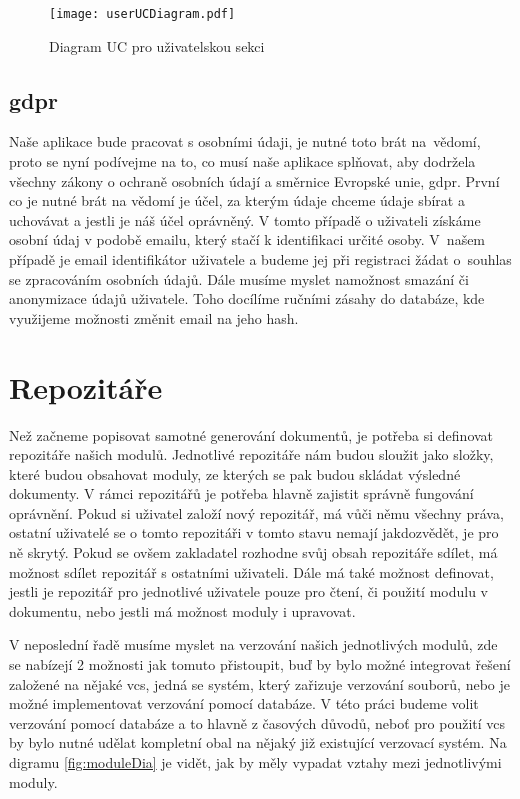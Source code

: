 \begin{figure}[h]
    \centering
    \texttt{[image: userUCDiagram.pdf]}
    \caption{Diagram UC pro uživatelskou sekci}
    \label{fig:userUCDiagram}
\end{figure}

\subsection{\gls{gdpr}}

Naše aplikace bude pracovat s osobními údaji, je nutné toto brát na~vědomí, proto se nyní podívejme na to, co musí naše aplikace splňovat, aby dodržela všechny
zákony o ochraně osobních údají a směrnice Evropské unie, \gls{gdpr}. První co je nutné brát na vědomí je účel, za kterým údaje chceme údaje sbírat a uchovávat a jestli je náš
účel oprávněný. V tomto případě o uživateli získáme osobní údaj v podobě emailu, který stačí k identifikaci určité osoby. V~našem případě je email identifikátor uživatele
a budeme jej při registraci žádat o~\mbox{souhlas} se zpracováním osobních údajů. Dále musíme myslet na\linebreak možnost smazání či anonymizace údajů uživatele. Toho docílíme ručními
zá\-sahy do databáze, kde využijeme možnosti změnit email na jeho hash. \cite{gdpr}

\section{Repozitáře}

Než začneme popisovat samotné generování dokumentů, je potřeba si \mbox{definovat} repozitáře našich modulů. Jednotlivé repozitáře nám budou sloužit jako složky,
které budou obsahovat moduly, ze kterých se pak budou skládat výsledné dokumenty. V rámci repozitářů je potřeba hlavně zajistit správně fungování oprávnění.
Pokud si uživatel založí nový repozitář, má vůči němu všechny práva, ostatní uživatelé se o tomto repozitáři v tomto stavu nemají jak\linebreak dozvědět, je pro ně
skrytý. Pokud se ovšem zakladatel rozhodne svůj obsah repozitáře sdílet, má možnost sdílet repozitář s ostatními uživateli.
Dále má také možnost definovat, jestli je repozitář pro jednotlivé uživatele pouze pro čtení, či použití modulu v dokumentu,
nebo jestli má možnost moduly i upravovat.

V neposlední řadě musíme myslet na verzování našich jednotlivých modulů, zde se nabízejí 2 možnosti jak tomuto přistoupit, buď by bylo možné integrovat
řešení založené na nějaké \gls{vcs}, jedná se systém, který zařizuje verzování souborů,
nebo je možné implementovat verzování pomocí databáze. V této práci budeme volit verzování pomocí databáze a to hlavně z časových důvodů, neboť
pro použití \gls{vcs} by bylo nutné udělat kompletní obal na nějaký již existující verzovací systém. Na digramu \ref{fig:moduleDia} je vidět, jak by měly
vypadat vztahy mezi jednotlivými moduly.


